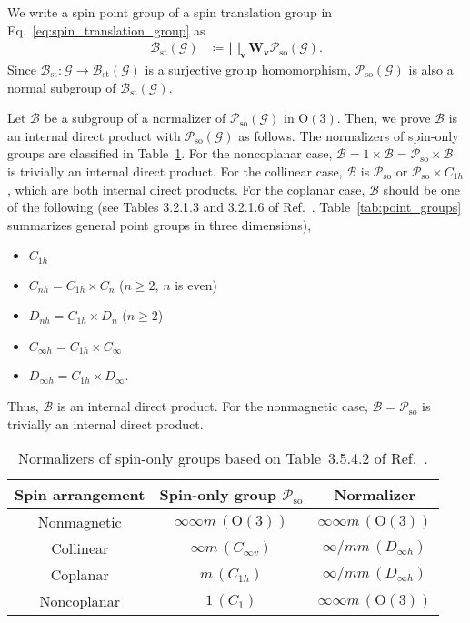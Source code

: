We write a spin point group of a spin translation group in Eq.~\eqref{eq:spin_translation_group} as
\begin{align}
    \mathcal{B}_{\mathrm{st}}(\mathcal{G})
        &\coloneqq \bigsqcup_{ \bm{v} } \bm{W}_{\bm{v}} \mathcal{P}_{\mathrm{so}}(\mathcal{G}).
\end{align}
Since $\mathcal{B}_{\mathrm{st}}: \mathcal{G} \to \mathcal{B}_{\mathrm{st}}(\mathcal{G})$ is a surjective group homomorphism, $\mathcal{P}_{\mathrm{so}}(\mathcal{G})$ is also a normal subgroup of $\mathcal{B}_{\mathrm{st}}(\mathcal{G})$.

Let $\mathcal{B}$ be a subgroup of a normalizer of $\mathcal{P}_{\mathrm{so}}(\mathcal{G})$ in $\mathrm{O}(3)$.
Then, we prove $\mathcal{B}$ is an internal direct product with $\mathcal{P}_{\mathrm{so}}(\mathcal{G})$ as follows.
The normalizers of spin-only groups are classified in Table~\ref{tab:spin_only_normalizers}.
For the noncoplanar case, $\mathcal{B} = 1 \times \mathcal{B} = \mathcal{P}_{\mathrm{so}} \times \mathcal{B}$ is trivially an internal direct product.
For the collinear case, $\mathcal{B}$ is $\mathcal{P}_{\mathrm{so}}$ or $\mathcal{P}_{\mathrm{so}} \times C_{1h}$, which are both internal direct products.
For the coplanar case, $\mathcal{B}$ should be one of the following (see Tables 3.2.1.3 and 3.2.1.6 of Ref.~\cite{hahn2016point}. Table~\ref{tab:point_groups} summarizes general point groups in three dimensions),
\begin{itemize}
  \item $C_{1h}$
  \item $C_{nh} = C_{1h} \times C_{n}$ ($n \geq 2$, $n$ is even)
  \item $D_{nh} = C_{1h} \times D_{n}$ ($n \geq 2$)
  \item $C_{\infty h} = C_{1h} \times C_{\infty}$
  \item $D_{\infty h} = C_{1h} \times D_{\infty}$.
\end{itemize}
Thus, $\mathcal{B}$ is an internal direct product.
For the nonmagnetic case, $\mathcal{B} = \mathcal{P}_{\mathrm{so}}$ is trivially an internal direct product.

\begin{table}[tb]
  \centering
  \caption{
    Normalizers of spin-only groups based on Table~3.5.4.2 of Ref.~\cite{koch2016normalizers}.
  }
  \label{tab:spin_only_normalizers}
  \begin{tabular}{ccc}
    \hline \hline
    Spin arrangement & Spin-only group $\mathcal{P}_{\mathrm{so}}$ & Normalizer \\
    \hline
    Nonmagnetic & $\infty \infty m \,(\mathrm{O}(3))$ & $\infty \infty m \,(\mathrm{O}(3))$ \\
    Collinear & $\infty m \,(C_{\infty v})$ & $\infty / mm \, (D_{\infty h})$ \\
    Coplanar & $m \,(C_{1h})$ & $\infty / mm \, (D_{\infty h})$ \\
    Noncoplanar & $1 \, (C_{1})$ & $\infty \infty m \,(\mathrm{O}(3))$ \\
    \hline \hline
  \end{tabular}
\end{table}

